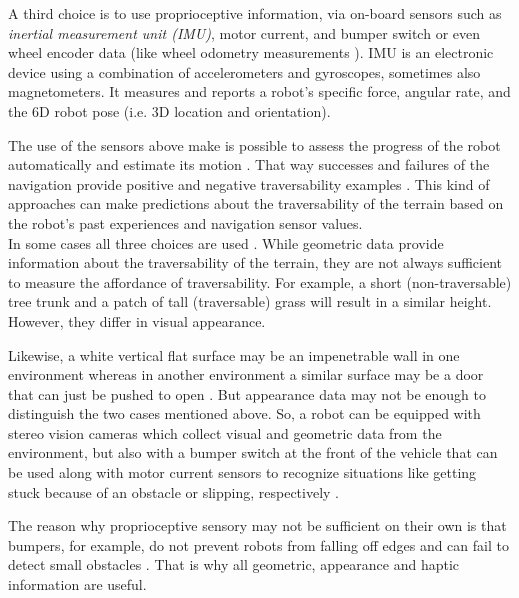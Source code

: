 \documentclass[12pt,a4paper]{report}
\newcommand{\term}{\textit}
\newcommand{\acronym}{\MakeUppercase}
\begin{document}
	A third choice is to use proprioceptive information, via on-board sensors such 
	as \term{inertial measurement unit (\acronym{imu})}, motor current, and bumper 
	switch \citep{Kim} or even wheel encoder data \citep{Lee} (like wheel odometry 
	measurements \citep{Droeschel}). \acronym{imu} is an electronic device using 
	a combination of accelerometers and gyroscopes, sometimes also magnetometers. 
	It measures and reports a robot's specific force, angular rate, and the 
	\acronym{6d} robot pose (i.e. \acronym{3d} location and orientation).
	\par
	The use of the sensors above make is possible to assess the progress of the 
	robot automatically and estimate its motion \citep{Droeschel}. That way successes 
	and failures of the navigation provide positive and negative traversability 
	examples \citep{Kim}. This kind of approaches can make predictions about the 
	traversability of the terrain based on the robot's past experiences and 
	navigation sensor values.
	\\
	
	In some cases all three choices are used \citep{Kim, Shneier}. While geometric 
	data provide information about the traversability of the terrain, they are 
	not always sufficient to measure the affordance of traversability. For 
	example, a short (non-traversable) tree trunk and a patch of tall (traversable) 
	grass will result in a similar height. However, they differ in visual 
	appearance. 
	\par 
	Likewise, a white vertical flat surface may be an impenetrable wall in one 
	environment whereas in another environment a similar surface may be a door that 
	can just be pushed to open \citep{Ugur}. But appearance data may not be enough 
	to distinguish the two cases mentioned above. So, a robot can be equipped with 
	stereo vision cameras which collect visual and geometric data from the 
	environment, but also with a bumper switch at the front of the vehicle that can 
	be used along with motor current sensors to recognize situations like getting 
	stuck because of an obstacle or slipping, respectively \citep{Kim}.
	\par
	The reason why proprioceptive sensory may not be sufficient on their own is that 
	bumpers, for example, do not prevent robots from falling off edges and can fail 
	to detect small obstacles \citep{HiroseGonet}. That is why all geometric, 
	appearance and haptic information are useful.
	\\\\
	
\end{document}
